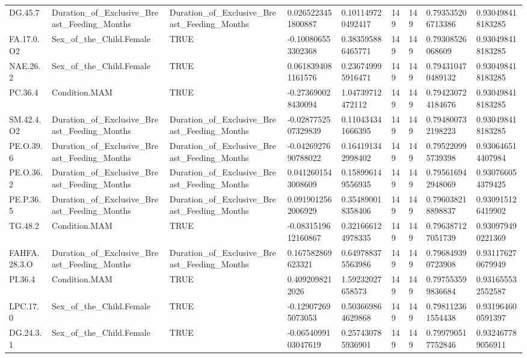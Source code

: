 \begin{longtable}{lllllllll}
DG.45.7 & Duration\_of\_Exclusive\_Breast\_Feeding\_Months & Duration\_of\_Exclusive\_Breast\_Feeding\_Months & 0.0265223451800887 & 0.101149720492417 & 149 & 149 & 0.793535206713386 & 0.930498418183285 \\
FA.17.0.O2 & Sex\_of\_the\_Child.Female & TRUE & -0.100806553302368 & 0.383595886465771 & 149 & 149 & 0.79308526068609 & 0.930498418183285 \\
NAE.26.2 & Sex\_of\_the\_Child.Female & TRUE & 0.0618394081161576 & 0.236749995916471 & 149 & 149 & 0.794310470489132 & 0.930498418183285 \\
PC.36.4 & Condition.MAM & TRUE & -0.273690028430094 & 1.04739712472112 & 149 & 149 & 0.794230724184676 & 0.930498418183285 \\
SM.42.4.O2 & Duration\_of\_Exclusive\_Breast\_Feeding\_Months & Duration\_of\_Exclusive\_Breast\_Feeding\_Months & -0.0287752507329839 & 0.110434341666395 & 149 & 149 & 0.794800732198223 & 0.930498418183285 \\
PE.O.39.6 & Duration\_of\_Exclusive\_Breast\_Feeding\_Months & Duration\_of\_Exclusive\_Breast\_Feeding\_Months & -0.0426927690788022 & 0.164191342998402 & 149 & 149 & 0.795220995739398 & 0.930646514407984 \\
PE.O.36.2 & Duration\_of\_Exclusive\_Breast\_Feeding\_Months & Duration\_of\_Exclusive\_Breast\_Feeding\_Months & 0.0412601543008609 & 0.158996149556935 & 149 & 149 & 0.795616942948069 & 0.930766054379425 \\
PE.P.36.5 & Duration\_of\_Exclusive\_Breast\_Feeding\_Months & Duration\_of\_Exclusive\_Breast\_Feeding\_Months & 0.0919012562006929 & 0.354890018358406 & 149 & 149 & 0.796038218898837 & 0.930915126419902 \\
TG.48.2 & Condition.MAM & TRUE & -0.0831519612160867 & 0.321666124978335 & 149 & 149 & 0.796387127051739 & 0.930979490221369 \\
FAHFA.28.3.O & Duration\_of\_Exclusive\_Breast\_Feeding\_Months & Duration\_of\_Exclusive\_Breast\_Feeding\_Months & 0.167582869623321 & 0.649788375563986 & 149 & 149 & 0.796849390723908 & 0.931176270679949 \\
PI.36.4 & Condition.MAM & TRUE & 0.4092098212026 & 1.59232027658573 & 149 & 149 & 0.797553599836684 & 0.931655532552587 \\
LPC.17.0 & Sex\_of\_the\_Child.Female & TRUE & -0.129072695073053 & 0.503669864629868 & 149 & 149 & 0.798112361554438 & 0.931964600591397 \\
DG.24.3.1 & Sex\_of\_the\_Child.Female & TRUE & -0.0654099103047619 & 0.257430785936901 & 149 & 149 & 0.799790517752846 & 0.932467789056911 \\

\end{longtable}
